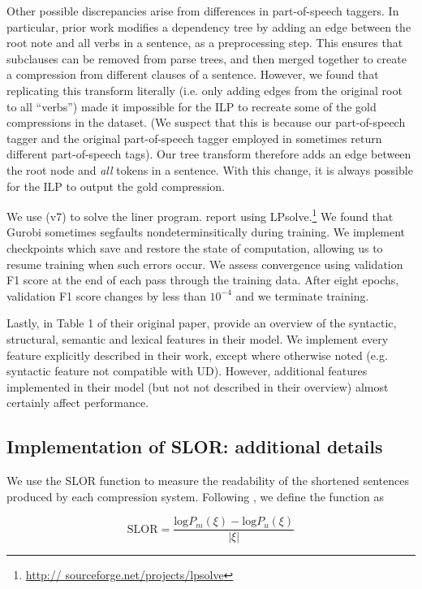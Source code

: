 Other possible discrepancies arise from differences in part-of-speech taggers. In particular, prior work modifies a dependency tree by adding an edge between the root note and all verbs in a sentence, as a preprocessing step. This ensures that subclauses can be removed from parse trees, and then merged together to create a compression from different clauses of a sentence. However, we found that replicating this transform literally (i.e. only adding edges from the original root to all ``verbs'') made it impossible for the ILP to recreate some of the gold compressions in the dataset. (We suspect that this is because our part-of-speech tagger and the original part-of-speech tagger employed in \citet{filippova2013overcoming} sometimes return different part-of-speech tags). Our tree transform therefore adds an edge between the root node and \textit{all} tokens in a sentence. With this change, it is always possible for the ILP to output the gold compression.

We use \citet{gurobi} (v7) to solve the liner program. \citet{filippova2008dependency} report using LPsolve.\footnote{\url{http://
sourceforge.net/projects/lpsolve}}  We found that Gurobi sometimes segfaults nondeterminsitically during training. We implement checkpoints which save and restore the state of computation, allowing us to resume training when such errors occur.  We assess convergence using validation F1 score at the end of each pass through the training data. After eight epochs, validation F1 score changes by less than $10^{-4}$ and we terminate training. 


Lastly, in Table 1 of their original paper, \citet{filippova2013overcoming} provide an overview of the syntactic, structural, semantic and lexical features in their model. We implement every feature explicitly described in their work, except where otherwise noted (e.g. syntactic feature not compatible with UD). However, additional features implemented in their model (but not not described in their overview) almost certainly affect performance. 


\subsection{Implementation of SLOR: additional details}

We use the SLOR function to measure the readability of the shortened sentences produced by each compression system. Following \cite{lau2015unsupervised}, we define the function as 

\begin{equation}
\text{SLOR}=\frac{\text{log}P_m(\xi) - \text{log}P_u(\xi)}{|\xi|}
\end{equation}

